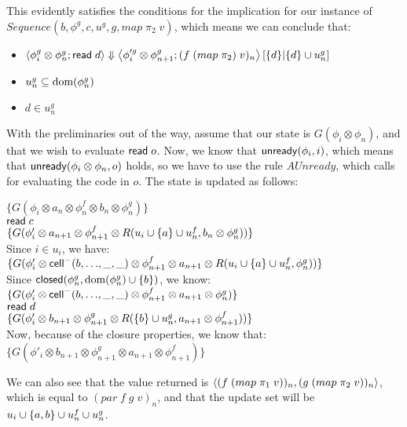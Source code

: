 \documentclass{article}
\begin{document}
This evidently satisfies the conditions for the implication for our
instance of $Sequence(b,\phi^g, c, u^g, g, map\;\pi_2\;v)$, which means we can conclude that: 

\begin{itemize}
\item $\left<{\phi^g_i \otimes \phi^g_n};{\mbox{\textsf{{read}}}\; d}\right>\Downarrow\left<{\phi'^g_i \otimes \phi^g_{n+1}};{(f \;(map\;\pi_2)\;v)_n}\right>\left[{\{{d}\}}|{\{{d}\} \cup u^g_n}\right]$ 
\item $u^g_n \subseteq \mbox{dom}({\phi^g_n})$ 
\item $d \in u^g_n$ 
\end{itemize}

With the preliminaries out of the way, assume that our state is
$G(\phi_i \otimes \phi_n)$, and that we wish to evaluate $\mbox{\textsf{{read}}}\;
o$.  Now, we know that $\mbox{\textsf{{unready}}}({\phi_i}, {i})$, which means that
$\mbox{\textsf{{unready}}}({\phi_i \otimes \phi_n}, {o})$ holds, so we have to use the rule
$AUnready$, which calls for evaluating the code in $o$. The state is
updated as follows:

\begin{tabbing}
$\{G(\phi_i \otimes a_n \otimes \phi^f_n \otimes b_n \otimes \phi^g_n)\}$ \\
$\mbox{\textsf{{read}}}\; c$ \\
$\{G(\phi'_i \otimes a_{n+1} \otimes \phi^f_{n+1} \otimes R(u_i \cup \{{a}\} \cup u^f_n,  b_n \otimes \phi^g_n))\}$ \\
Since $i \in u_i$, we have: \\
$\{G(\phi'_i \otimes \mbox{\textsf{{cell}}}^{-}({b}, {\ldots}, {\_}, {\_}) \otimes \phi^f_{n+1} 
   \otimes a_{n+1} \otimes
   R(u_i \cup \{{a}\} \cup u^f_n, \phi^g_n))\}$ \\
Since $\mbox{\textsf{{closed}}}({\phi^g_n}, {\mbox{dom}({\phi^g_n}) \cup \{{b}\}})$, we know: \\
$\{G(\phi'_i \otimes \mbox{\textsf{{cell}}}^{-}({b}, {\ldots}, {\_}, {\_}) \otimes \phi^f_{n+1} 
   \otimes a_{n+1} \otimes \phi^g_n)\}$ \\
$\mbox{\textsf{{read}}}\; d$ \\
$\{G(\phi'_i \otimes b_{n+1} \otimes \phi^g_{n+1} 
   \otimes R(\{{b}\} \cup u^g_n, a_{n+1} \otimes
                                           \phi^f_{n+1}))\}$ \\
Now, because of the closure properties, we know that:\\
$\{G(\phi'_i \otimes b_{n+1} \otimes \phi^g_{n+1} 
   \otimes a_{n+1} \otimes \phi^f_{n+1})\}$ \\
\end{tabbing}
We can also see that the value returned is $\left<{(f\;(map\;\pi_1\;v))_n},{(g\;(map\;\pi_2\;v))_n}\right>$, which is equal to $(par\;f\;g\;v)_n$, and that the update set will be $u_i \cup \{{a,b}\} \cup u^f_n \cup u^g_n$. 
\end{document}
